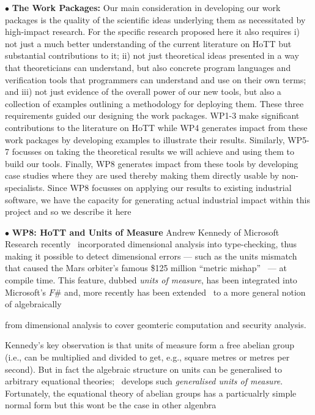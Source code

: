 \documentclass[a4paper,11pt]{article}
\begin{document}
$\bullet$ {\bf The Work Packages:} Our main consideration in
developing our work packages is the quality of the scientific ideas
underlying them as necessitated by high-impact research.
For the specific research proposed here it also requires
i) not just a much better understanding of the current
literature on HoTT but substantial contributions to it; ii) not just
theoretical ideas presented in a way that theoreticians can
understand, but also concrete program languages and verification tools
that programmers can understand and use on their own terms; and iii)
not just evidence of the overall power of our new tools, but also a
collection of examples outlining a methodology for deploying them.
These three requirements guided our designing the work packages. WP1-3
make significant contributions to the literature on HoTT while WP4
generates impact from these work packages by developing examples to
illustrate their results. Similarly, WP5-7 focusses on taking the
theoretical results we will achieve and using them to build our
tools. Finally, WP8 generates impact from these tools by developing
case studies where they are used thereby making them
directly usable by non-specialists.  Since WP8 focusses on 
applying our results to existing industrial software, we have the
capacity for generating actual industrial impact within this project
and so we describe it here

\vspace*{0.02in}

$\bullet$ {\bf WP8: HoTT and Units of Measure} Andrew Kennedy of
Microsoft Research recently~\cite{aknn97} incorporated dimensional
analysis into type-checking, thus making it possible to detect
dimensional errors --- such as the units mismatch that caused the Mars
orbiter's famous \$125 million ``metric mishap''~\cite{wp99} --- at
compile time. This feature, dubbed {\em units of measure}, has been
integrated into Microsoft's $F\#$ and, more recently has been
extended~\cite{ajk} to a more general notion of algebraically 

from dimensional analysis to cover geomteric
computation and security analysis.

Kennedy's key observation is that units of measure form a free abelian
group (i.e., can be multiplied and divided to get, e.g., square metres
or metres per second). But in fact the algebraic structure on units
can be generalised to arbitrary equational theories;~\cite{ajk}
develops such {\em generalised units of measure}. Fortunately, the
equational theory of abelian groups has a particualrly simple normal
form but this wont be the case in other algenbra
\end{document}

